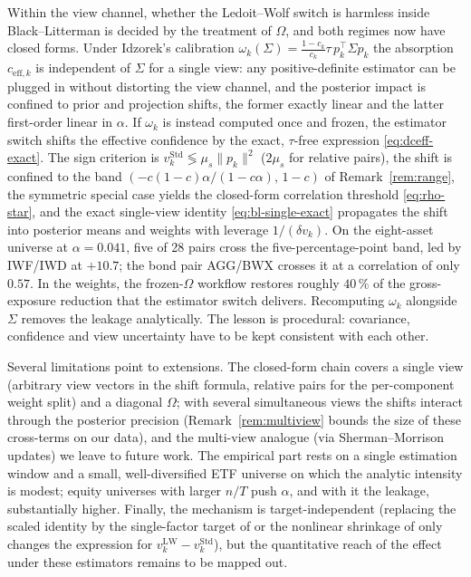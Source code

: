 \documentclass[a4paper,11pt]{article}
\theoremstyle{plain}
\theoremstyle{definition}
\newcommand{\Std}{\mathrm{Std}}
\newcommand{\LW}{\mathrm{LW}}
\newcommand{\eff}{\mathrm{eff}}
\begin{document}
Within the view channel, whether the Ledoit--Wolf switch is harmless
inside Black--Litterman is
decided by the treatment of $\Omega$, and both regimes now have closed
forms. Under Idzorek's calibration
$\omega_k(\Sigma) = \tfrac{1-c_k}{c_k}\tau\,p_k^\top\Sigma p_k$ the
absorption $c_{\eff,k}$ is independent of $\Sigma$ for a single view:
any positive-definite estimator can be plugged in without distorting the
view channel, and the posterior impact is confined to prior and
projection shifts, the former exactly linear and the latter first-order
linear in $\alpha$. If
$\omega_k$ is instead computed once and frozen, the estimator switch
shifts the effective confidence by the exact, $\tau$-free expression
\eqref{eq:dceff-exact}. The sign criterion is
$v_k^\Std \lessgtr \mu_s\lVert p_k\rVert^2$ ($2\mu_s$ for relative
pairs), the shift is confined to the band
$(-c(1-c)\alpha/(1-c\alpha),\,1-c)$ of Remark~\ref{rem:range}, the
symmetric special case yields the closed-form correlation threshold
\eqref{eq:rho-star}, and the exact
single-view identity \eqref{eq:bl-single-exact} propagates the shift
into posterior means and weights with leverage $1/(\delta v_k)$. On the
eight-asset universe at $\alpha = 0.041$, five of 28 pairs cross the
five-percentage-point band, led by IWF/IWD at $+10.7$; the bond pair
AGG/BWX crosses it at a correlation of only $0.57$. In the weights, the
frozen-$\Omega$ workflow restores roughly $40\,\%$ of the
gross-exposure reduction that the estimator switch delivers.
Recomputing $\omega_k$ alongside $\Sigma$ removes the leakage
analytically. The lesson is procedural: covariance, confidence and view
uncertainty have to be kept consistent with each other.

Several limitations point to extensions. The closed-form chain covers a
single view (arbitrary view vectors in the shift formula, relative
pairs for the per-component weight split) and a diagonal $\Omega$; with
several simultaneous
views the shifts interact through the posterior precision
(Remark~\ref{rem:multiview} bounds the size of these cross-terms on our
data), and the multi-view analogue (via Sherman--Morrison updates) we
leave to future work. The empirical part
rests on a single estimation window and a small, well-diversified ETF
universe on which the analytic intensity is modest; equity universes
with larger $n/T$ push $\alpha$, and with it the leakage, substantially
higher. Finally, the mechanism is target-independent (replacing the
scaled identity by the single-factor target of \citet{LedoitWolf2003} or
the nonlinear shrinkage of \citet{LedoitWolf2017} only changes the
expression for $v_k^{\LW} - v_k^\Std$), but the quantitative reach of
the effect under these estimators remains to be mapped out.
\end{document}
